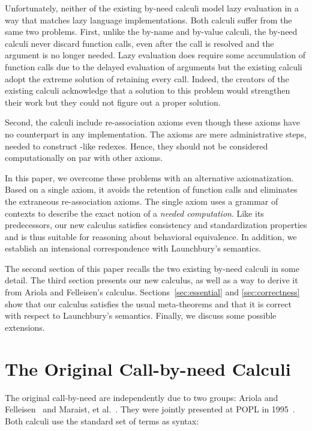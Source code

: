 \documentclass[runningheads,a4paper]{llncs}
\begin{document}
Unfortunately, neither of the existing by-need calculi model lazy evaluation
 in a way that matches lazy language implementations. Both calculi suffer from
 the same two problems. First, unlike the by-name and by-value calculi, the
 by-need calculi never discard function calls, even after the call is resolved
 and the argument is no longer needed. Lazy evaluation does require some
 accumulation of function calls due to the delayed evaluation of arguments but
 the existing calculi adopt the extreme solution of retaining every
 call. Indeed, the creators of the existing calculi acknowledge that a solution
 to this problem would strengthen their work but they could not figure out a
 proper solution.

Second, the calculi include re-association axioms even though these axioms
 have no counterpart in any implementation. The axioms are mere
 administrative steps, needed to construct -like redexes. Hence, they
 should not be considered computationally on par with other axioms.

In this paper, we overcome these problems with an alternative
 axiomatization. Based on a single axiom, it avoids the retention of 
 function calls and eliminates the extraneous re-association axioms. The single axiom
 uses a grammar of contexts to describe the exact notion of a \emph{needed
   computation}. Like its predecessors, our new calculus satisfies consistency
 and standardization properties and is thus suitable for reasoning about
 behavioral equivalence. In addition, we establish an intensional
 correspondence with Launchbury's semantics.
 
The second section of this paper recalls the two existing by-need calculi in
 some detail. The third section presents our new calculus, as well as a way to
 derive it from Ariola and Felleisen's calculus. Sections~\ref{sec:essential}
 and \ref{sec:correctness} show that our calculus satisfies the usual
 meta-theorems and that it is correct with respect to Launchbury's
 semantics. Finally, we discuss some possible extensions.
 
\section{The Original Call-by-need  Calculi}

The original call-by-need \lcs are independently due to two groups: Ariola and
 Felleisen~\cite{Ariola1994Cbneed,Ariola1997Cbneed} and Maraist, et
 al.~\cite{Maraist1994Cbneed,Maraist1998Cbneed}. They were jointly presented at
 POPL in 1995~\cite{Ariola1995Cbneed}. Both calculi use the standard set of
 terms as syntax:
\end{document}
